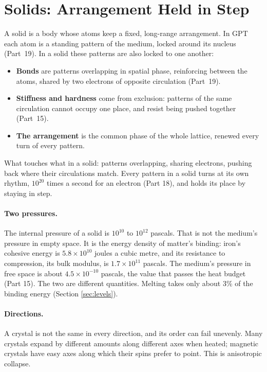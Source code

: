 \documentclass[11pt,a4paper]{article}
\begin{document}
\section{Solids: Arrangement Held in Step}
\label{sec:solids}

\begin{hypbar}
A solid is a body whose atoms keep a fixed, long-range arrangement. In GPT each atom is a standing pattern of the medium, locked around its nucleus (Part~19). In a solid these patterns are also locked to one another:
\begin{itemize}
\item \textbf{Bonds} are patterns overlapping in spatial phase, reinforcing between the atoms, shared by two electrons of opposite circulation (Part~19).
\item \textbf{Stiffness and hardness} come from exclusion: patterns of the same circulation cannot occupy one place, and resist being pushed together (Part~15).
\item \textbf{The arrangement} is the common phase of the whole lattice, renewed every turn of every pattern.
\end{itemize}
\end{hypbar}

What touches what in a solid: patterns overlapping, sharing electrons, pushing back where their circulations match.  Every pattern in a solid turns at its own rhythm, $10^{20}$ times a second for an electron (Part 18), and holds its place by staying in step.

\paragraph{Two pressures.} The internal pressure of a solid is $10^{10}$ to $10^{12}$ pascals. That is not the medium's pressure in empty space. It is the energy density of matter's binding: iron's cohesive energy is $5.8\times10^{10}$ joules a cubic metre, and its resistance to compression, its bulk modulus, is $1.7\times10^{11}$ pascals.  The medium's pressure in free space is about $4.5\times10^{-10}$ pascals, the value that passes the heat budget (Part 15). The two are different quantities. Melting takes only about 3\% of the binding energy (Section \ref{sec:levels}).

\paragraph{Directions.} A crystal is not the same in every direction, and its order can fail unevenly. Many crystals expand by different amounts along different axes when heated; magnetic crystals have easy axes along which their spins prefer to point. This is anisotropic collapse.
\end{document}
